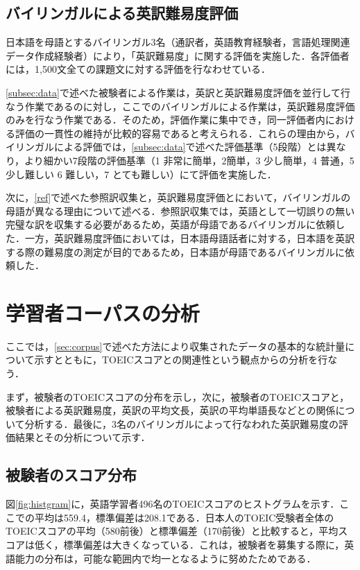 \documentclass[japanese]{jnlp_1.4}
\begin{document}
\subsection{バイリンガルによる英訳難易度評価}
\label{subsec:eval}

日本語を母語とするバイリンガル3名（通訳者，英語教育経験者，言語処理関連データ作成経験者）により，「英訳難易度」に関する評価を実施した．各評価者には，1,500文全ての課題文に対する評価を行なわせている．


\ref{subsec:data}で述べた被験者による作業は，英訳と英訳難易度評価を並行して行なう作業であるのに対し，ここでのバイリンガルによる作業は，英訳難易度評価のみを行なう作業である．そのため，評価作業に集中でき，同一評価者内における評価の一貫性の維持が比較的容易であると考えられる．これらの理由から，バイリンガルによる評価では，\ref{subsec:data}で述べた評価基準（5段階）とは異なり，より細かい7段階の評価基準（1 非常に簡単，2簡単，3 少し簡単，4 普通，5 少し難しい 6 難しい，7 とても難しい）にて評価を実施した．

次に，\ref{ref}で述べた参照訳収集と，英訳難易度評価とにおいて，バイリンガルの母語が異なる理由について述べる．参照訳収集では，英語として一切誤りの無い完璧な訳を収集する必要があるため，英語が母語であるバイリンガルに依頼した．一方，英訳難易度評価においては，日本語母語話者に対する，日本語を英訳する際の難易度の測定が目的であるため，日本語が母語であるバイリンガルに依頼した．


\section{学習者コーパスの分析}
\label{sec:analysis}

ここでは，\ref{sec:corpus}で述べた方法により収集されたデータの基本的な統計量について示すとともに，TOEICスコアとの関連性という観点からの分析を行なう．

まず，被験者のTOEICスコアの分布を示し，次に，被験者のTOEICスコアと，被験者による英訳難易度，英訳の平均文長，英訳の平均単語長などとの関係について分析する．最後に，3名のバイリンガルによって行なわれた英訳難易度の評価結果とその分析について示す．

\subsection{被験者のスコア分布}

図\ref{fig:histgram}に，英語学習者496名のTOEICスコアのヒストグラムを示す．ここでの平均は559.4，標準偏差は208.1である．日本人のTOEIC受験者全体のTOEICスコアの平均（580前後）と標準偏差（170前後）\cite{toeic}と比較すると，平均スコアは低く，標準偏差は大きくなっている．これは，被験者を募集する際に，英語能力の分布は，可能な範囲内で均一となるように努めたためである．
\end{document}
